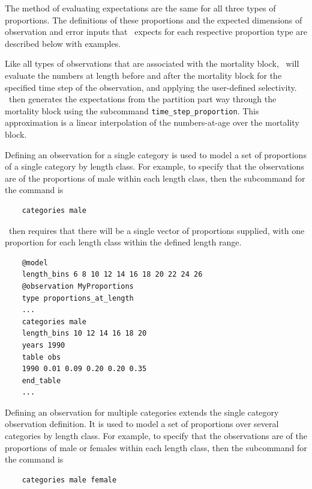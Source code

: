 The method of evaluating expectations are the same for all three types of proportions. The definitions of these proportions and the expected dimensions of observation and error inputs that \CNAME\ expects for each respective proportion type are described below with examples.

Like all types of observations that are associated with the mortality block, \CNAME\ will evaluate the numbers at length before and after the mortality block for the specified time step of the observation, and applying the user-defined selectivity. \CNAME\ then generates the expectations from the partition part way through the mortality block using the subcommand \texttt{time\_step\_proportion}. This approximation is a linear interpolation of the numbers-at-age over the mortality block.

Defining an observation for a single category is used to model a set of proportions of a single category by length class. For example, to specify that the observations are of the proportions of male within each length class, then the subcommand  for the  command is

{\small{\begin{verbatim}
	categories male
\end{verbatim}}}

\CNAME\ then requires that there will be a single vector of proportions supplied, with one proportion for each length class within the defined length range.

{\small{\begin{verbatim}
	@model
	length_bins 6 8 10 12 14 16 18 20 22 24 26
	@observation MyProportions
	type proportions_at_length
	...
	categories male
	length_bins 10 12 14 16 18 20
	years 1990
	table obs
	1990 0.01 0.09 0.20 0.20 0.35 
	end_table
	...
\end{verbatim}}}

Defining an observation for multiple categories extends the single category observation definition. It is used to model a set of proportions over several categories by length class. For example, to specify that the observations are of the proportions of male or females within each length class, then the subcommand  for the  command is

{\small{\begin{verbatim}
	categories male female
\end{verbatim}}}

